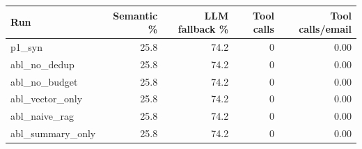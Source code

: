 \begin{tabular}{lrrrr}
\toprule
Run & Semantic \% & LLM fallback \% & Tool calls & Tool calls/email \\
\midrule
p1\_syn & 25.8 & 74.2 & 0 & 0.00 \\
abl\_no\_dedup & 25.8 & 74.2 & 0 & 0.00 \\
abl\_no\_budget & 25.8 & 74.2 & 0 & 0.00 \\
abl\_vector\_only & 25.8 & 74.2 & 0 & 0.00 \\
abl\_naive\_rag & 25.8 & 74.2 & 0 & 0.00 \\
abl\_summary\_only & 25.8 & 74.2 & 0 & 0.00 \\
\bottomrule
\end{tabular}
